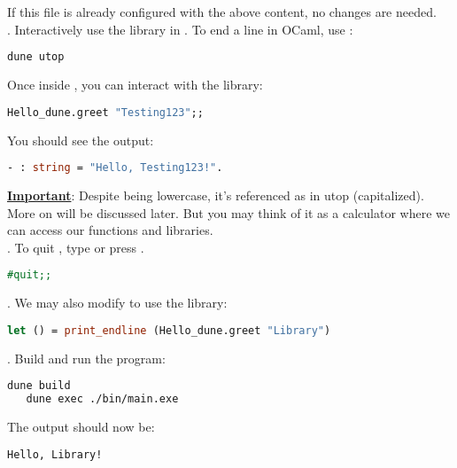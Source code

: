    \noindent If this file is already configured with the above content, no changes are needed.\\

\vspace{.5em}
. Interactively use the library in . To end a line in OCaml, use \snippet{;;}:
   \begin{lstlisting}[language=Bash]
   dune utop
   \end{lstlisting}

   \noindent Once inside , you can interact with the library:
   \begin{lstlisting}[language=OCaml, caption={Using the Library in Utop}]
   Hello_dune.greet "Testing123";;
   \end{lstlisting}

   \noindent
   You should see the output: 

    \begin{lstlisting}[language=OCaml]
    - : string = "Hello, Testing123!".
    \end{lstlisting}
   \vspace{.5em}
   \noindent
   \underline{\textbf{Important}}: Despite  being lowercase, it's referenced as  in utop (capitalized).
   More on  will be discussed later. But you may think of it as a calculator where we can access our functions and libraries.\\

. To quit , type  or press .
   \begin{lstlisting}[language=OCaml, caption={Quitting utop}]
   #quit;;
   \end{lstlisting}

\newpage
{}. We may also modify  to use the library:
   \begin{lstlisting}[language=OCaml, caption={Using the Library in Main}]
   let () = print_endline (Hello_dune.greet "Library")
   \end{lstlisting}

. Build and run the program:
   \begin{lstlisting}[language=Bash]
   dune build
   dune exec ./bin/main.exe
   \end{lstlisting}

   \noindent The output should now be:
   \begin{lstlisting}[language=Bash]
   Hello, Library!
   \end{lstlisting}


